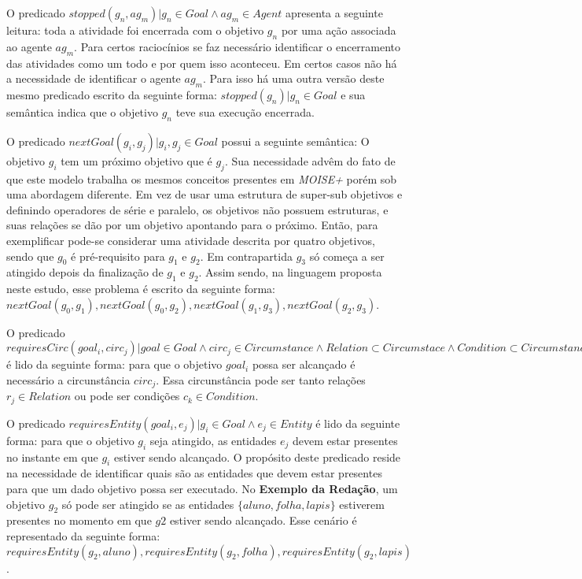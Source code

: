 O predicado $stopped(g_n, ag_m) | g_n \in Goal \wedge ag_m \in Agent$ apresenta a seguinte leitura: toda a atividade foi encerrada com o objetivo $g_n$ por uma ação associada ao agente $ag_m$. Para certos raciocínios se faz necessário identificar o encerramento das atividades como um todo e por quem isso aconteceu. Em certos casos não há a necessidade de identificar o agente $ag_m$. Para isso há uma outra versão deste mesmo predicado escrito da seguinte forma: $stopped(g_n) | g_n \in Goal $ e sua semântica indica que o objetivo $g_n$ teve sua execução encerrada. 

O predicado $nextGoal(g_i,g_j) |g_i, g_j \in Goal$ possui a seguinte semântica: O objetivo $g_i$ tem um próximo objetivo que é $g_j$. Sua necessidade advêm do fato de que este modelo trabalha os mesmos conceitos presentes em \textit{MOISE+} porém sob uma abordagem diferente. Em vez de usar uma estrutura de super-sub objetivos e definindo operadores de série e paralelo, os objetivos não possuem estruturas, e suas relações se dão por um objetivo apontando para o próximo. Então, para exemplificar pode-se considerar uma atividade descrita por quatro objetivos, sendo que $g_0$ é pré-requisito para $g_1$ e $g_2$. Em contrapartida $g_3$ só começa a ser atingido depois da finalização de $g_1$ e $g_2$. Assim sendo, na linguagem proposta neste estudo, esse problema é escrito da seguinte forma: $nextGoal(g_0,g_1), nextGoal(g_0,g_2), nextGoal(g_1,g_3), nextGoal(g_2,g_3)$.

O predicado $requiresCirc(goal_i,circ_j) | goal \in Goal \wedge circ_j \in Circumstance \wedge Relation \subset Circumstace \wedge Condition \subset Circumstance$ é lido da seguinte forma: para que o objetivo $goal_i$ possa ser alcançado é necessário a circunstância $circ_j$. Essa circunstância pode ser tanto relações $r_j \in Relation$ ou pode ser condições $c_k \in Condition$.

O predicado $requiresEntity(goal_i, e_j) | g_i \in Goal \wedge e_j \in Entity $ é lido da seguinte forma: para que o objetivo $g_i$ seja atingido, as entidades $e_j$ devem estar presentes no instante em que $g_i$ estiver sendo alcançado. O propósito deste predicado reside na necessidade de identificar quais são as entidades que devem estar presentes para que um dado objetivo possa ser executado. No \textbf{Exemplo da Redação}, um objetivo $g_2$ só pode ser atingido se as entidades $\{ aluno, folha, lapis\}$ estiverem presentes no momento em que $g2$ estiver sendo alcançado. Esse cenário é representado da seguinte forma: $requiresEntity(g_2, aluno), requiresEntity(g_2, folha), requiresEntity(g_2, lapis)$.

